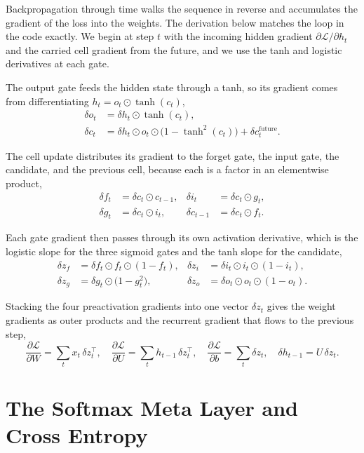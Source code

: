 \documentclass[12pt,letterpaper]{article}
\begin{document}
Backpropagation through time walks the sequence in reverse and accumulates the
gradient of the loss into the weights. The derivation below matches the loop in
the code exactly. We begin at step $t$ with the incoming hidden gradient
$\partial \mathcal{L} / \partial h_t$ and the carried cell gradient from the
future, and we use the tanh and logistic derivatives at each gate.

The output gate feeds the hidden state through a tanh, so its gradient comes
from differentiating $h_t = o_t \odot \tanh(c_t)$,
\begin{align*}
\delta o_t &= \delta h_t \odot \tanh(c_t), \\
\delta c_t &= \delta h_t \odot o_t \odot \bigl(1 - \tanh^2(c_t)\bigr) + \delta c_t^{\text{future}}.
\end{align*}

The cell update distributes its gradient to the forget gate, the input gate, the
candidate, and the previous cell, because each is a factor in an elementwise
product,
\begin{align*}
\delta f_t &= \delta c_t \odot c_{t-1}, &
\delta i_t &= \delta c_t \odot g_t, \\
\delta g_t &= \delta c_t \odot i_t, &
\delta c_{t-1} &= \delta c_t \odot f_t.
\end{align*}

Each gate gradient then passes through its own activation derivative, which is
the logistic slope for the three sigmoid gates and the tanh slope for the
candidate,
\begin{align*}
\delta z_f &= \delta f_t \odot f_t \odot (1 - f_t), &
\delta z_i &= \delta i_t \odot i_t \odot (1 - i_t), \\
\delta z_g &= \delta g_t \odot \bigl(1 - g_t^2\bigr), &
\delta z_o &= \delta o_t \odot o_t \odot (1 - o_t).
\end{align*}

Stacking the four preactivation gradients into one vector $\delta z_t$ gives the
weight gradients as outer products and the recurrent gradient that flows to the
previous step,
\[
\boxed{\;
\frac{\partial \mathcal{L}}{\partial W} = \sum_t x_t\,\delta z_t^{\top},
\quad
\frac{\partial \mathcal{L}}{\partial U} = \sum_t h_{t-1}\,\delta z_t^{\top},
\quad
\frac{\partial \mathcal{L}}{\partial b} = \sum_t \delta z_t,
\quad
\delta h_{t-1} = U\,\delta z_t . \;}
\]

\clearpage
\section{The Softmax Meta Layer and Cross Entropy}
\end{document}
